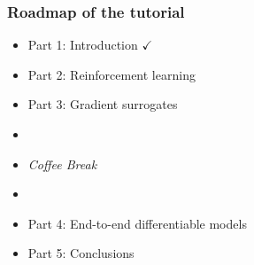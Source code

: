 



\begin{frame}%
\frametitle{Roadmap of the tutorial}%

\begin{itemize}
\item Part 1: Introduction $\checkmark$
\item Part 2: Reinforcement learning
\item Part 3: Gradient surrogates
\item[]
\item[] \emph{Coffee Break}
\item[]
\item Part 4: End-to-end differentiable models
\item Part 5: Conclusions
\end{itemize}

\end{frame}


